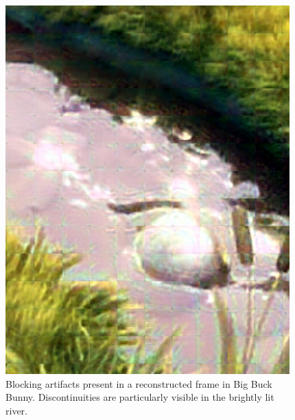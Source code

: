 \documentclass[10pt,twocolumn,letterpaper]{article}
\begin{document}
\begin{figure}[t]
\begin{center}
  \includegraphics[width=0.4\linewidth]{block}
\end{center}
   \caption{Blocking artifacts present in a reconstructed frame in Big Buck Bunny. Discontinuities are particularly visible in the brightly lit river.}
   \label{fig:block}
\end{figure}
\end{document}
